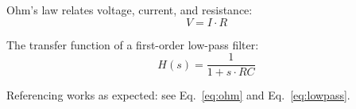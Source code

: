 Ohm's law relates voltage, current, and resistance:
\begin{equation}
    V = I \cdot R
    \label{eq:ohm}
\end{equation}

The transfer function of a first-order low-pass filter:
\begin{equation}
    H(s) = \frac{1}{1 + s \cdot R C}
    \label{eq:lowpass}
\end{equation}

Referencing works as expected: see Eq.~\eqref{eq:ohm} and Eq.~\eqref{eq:lowpass}.
